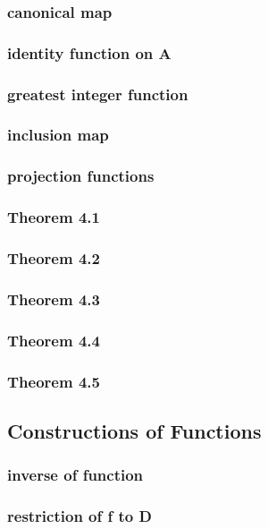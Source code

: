 \documentclass[a4paper]{article}
\begin{document}
\subsubsection*{canonical map}
\subsubsection*{identity function on A}
\subsubsection*{greatest integer function}
\subsubsection*{inclusion map}
\subsubsection*{projection functions}
\subsubsection*{Theorem 4.1}
\subsubsection*{Theorem 4.2}
\subsubsection*{Theorem 4.3}
\subsubsection*{Theorem 4.4}
\subsubsection*{Theorem 4.5}

\newpage
\subsection{Constructions of Functions}   %
\subsubsection*{inverse of function}
\subsubsection*{restriction of f to D}
\end{document}
